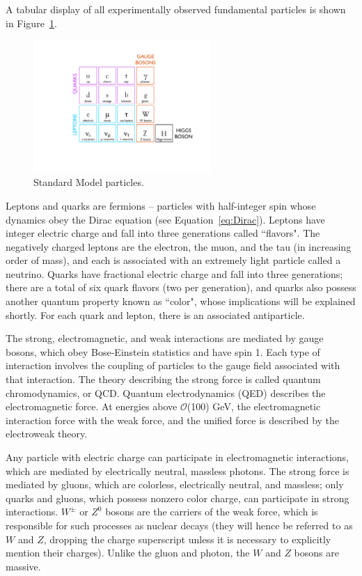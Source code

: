A tabular display of all experimentally observed fundamental particles is shown in Figure~\ref{fig:StandardModelTable}.

\begin{figure}
   \begin{center}
      \includegraphics[width=0.6\textwidth]{figures/StandardModelTable}
      \caption{Standard Model particles.}
      \label{fig:StandardModelTable}
   \end{center}
\end{figure}

Leptons and quarks are fermions -- particles with half-integer spin whose dynamics obey the Dirac equation (see Equation~\ref{eq:Dirac}). Leptons have integer electric charge and fall into three generations called ``flavors". The negatively charged leptons are the electron, the muon, and the tau (in increasing order of mass), and each is associated with an extremely light particle called a neutrino. Quarks have fractional electric charge and fall into three generations; there are a total of six quark flavors (two per generation), and quarks also possess another quantum property known as ``color", whose implications will be explained shortly. For each quark and lepton, there is an associated antiparticle.

The strong, electromagnetic, and weak interactions are mediated by gauge bosons, which obey Bose-Einstein statistics and have spin 1. Each type of interaction involves the coupling of particles to the gauge field associated with that interaction. The theory describing the strong force is called quantum chromodynamics, or QCD. Quantum electrodynamics (QED) describes the electromagnetic force. At energies above $\mathcal{O}$(100) GeV, the electromagnetic interaction force with the weak force, and the unified force is described by the electroweak theory.

Any particle with electric charge can participate in electromagnetic interactions, which are mediated by electrically neutral, massless photons. The strong force is mediated by gluons, which are colorless, electrically neutral, and massless; only quarks and gluons, which possess nonzero color charge, can participate in strong interactions. $W^{\pm}$ or $Z^{0}$ bosons are the carriers of the weak force, which is responsible for such processes as nuclear decays (they will hence be referred to as $W$ and $Z$, dropping the charge superscript unless it is necessary to explicitly mention their charges). Unlike the gluon and photon, the $W$ and $Z$ bosons are massive.

